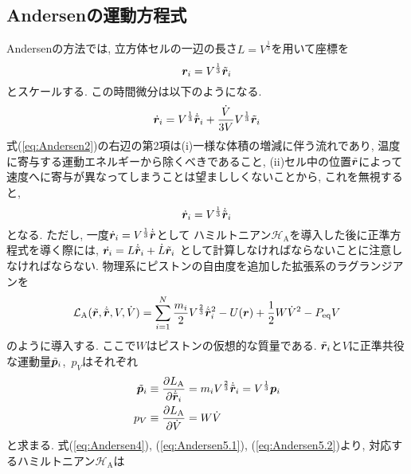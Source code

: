 \subsection{Andersenの運動方程式}
Andersenの方法では, 立方体セルの一辺の長さ$L=V^{\frac{1}{3}}$を用いて座標を
\begin{equation}
 \bm{r}_{i} = V^{\frac{1}{3}} \Tilde{\bm{r}}_{i}
 \label{eq:Andersen1}
\end{equation}
とスケールする. この時間微分は以下のようになる. 
\begin{equation}
 \dot{\bm{r}}_{i}
  = V^{\frac{1}{3}} \dot{\Tilde{\bm{r}}}_{i}
  + \frac{\dot{V}}{3V} V^{\frac{1}{3}} \tilde{\bm{r}}_{i}
  \label{eq:Andersen2}
\end{equation}
式(\ref{eq:Andersen2})の右辺の第2項は(i)一様な体積の増減に伴う流れであり, 温度に寄与する運動エネルギーから除くべきであること, 
(ii)セル中の位置$\Tilde{\bm{r}}$によって速度へに寄与が異なってしまうことは望まししくないことから, これを無視すると, 
\begin{equation}
 \dot{\bm{r}}_{i}
  = V^{\frac{1}{3}} \dot{\Tilde{\bm{r}}}_{i}
 \label{eq:Andersen3}
\end{equation}
となる. ただし, 一度$\dot{\bm{r}}_{i} = V^{\frac{1}{3}}\dot{\Tilde{\bm{r}}}$として
ハミルトニアン$\mathcal{H}_{\mathrm{A}}$を導入した後に正準方程式を導く際には, 
$\dot{\bm{r}_{i}} = L \dot{\Tilde{\bm{r}}}_{i}+\dot{L}\Tilde{\bm{r}}_{i}$
として計算しなければならないことに注意しなければならない. 
物理系にピストンの自由度を追加した拡張系のラグランジアンを
\begin{equation}
 \mathcal{L}_{\mathrm{A}}
 (\Tilde{\bm{r}}, \dot{\Tilde{\bm{r}}}, V, \dot{V})
  =
  \sum_{i=1}^{N} \frac{m_{i}}{2} V^{\frac{2}{3}} \dot{\Tilde{\bm{r}}}_{i}^{2}
  - U(\bm{r}) + \frac{1}{2} W \dot{V}^{2} - P_{\mathrm{eq}}V
 \label{eq:Andersen4}
\end{equation}
のように導入する. 
ここで$W$はピストンの仮想的な質量である.
$\Tilde{\bm{r}}_{i}$と$V$に正準共役な運動量$\Tilde{\bm{p}}_{i}$,~$p_{V}$はそれぞれ
\begin{align}
 \Tilde{\bm{p}}_{i}
 &\equiv
 \frac{\partial L_{\mathrm{A}}}{\partial \dot{\Tilde{\bm{r}}}_{i}}
 =
 m_{i} V^{\frac{2}{3}} \dot{\Tilde{\bm{r}}}_{i}
 =
 V^{\frac{1}{3}} \bm{p}_{i}
 \label{eq:Andersen5.1}
 \\
 p_{V}
 &\equiv
 \frac{\partial L_{\mathrm{A}}}{\partial \dot{V}}
 =
 W \dot{V}
 \label{eq:Andersen5.2}
\end{align}
と求まる. 
式(\ref{eq:Andersen4}), (\ref{eq:Andersen5.1}), (\ref{eq:Andersen5.2})より, 対応するハミルトニアン$\mathcal{H}_{\mathrm{A}}$は
